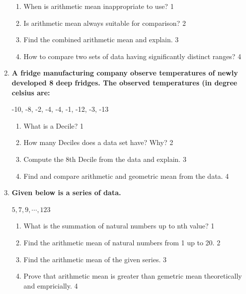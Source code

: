 \documentclass[a4paper,oneside]{book}
\begin{document}
\begin{enumerate}
  \begin{enumerate}
    \item
	When is arithmetic mean inappropriate to use? \hfill 1
    \item
	Is arithmetic mean always suitable for comparison? \hfill 2
    \item  
	Find the combined arithmetic mean and explain. \hfill 3
    \item
	How to compare two sets of data having significantly distinct ranges? \hfill 4
  \end{enumerate}
  
   \item
	  \textbf{A fridge manufacturing company observe temperatures of newly developed 8 deep fridges. The observed temperatures (in degree celsius are:} 
	  
	    \begin{center}
-10, -8, -2, -4, -4, -1, -12, -3, -13
  \end{center}
  
  \begin{enumerate}
    \item
	What is a Decile? \hfill 1
    \item
	How many Deciles does a data set have? Why? \hfill 2
    \item  
	Compute the 8th Decile from the data and explain. \hfill 3
    \item
	Find and compare arithmetic and geometric mean from the data. \hfill 4
  \end{enumerate}
  
   \item
	  \textbf{Given below is a series of data.} 
	  
	  	    \begin{center}
	 $5, 7, 9, \cdots , 123$
	    \end{center}
  
  \begin{enumerate}
    \item
	What is the summation of natural numbers up to nth value? \hfill 1
    \item
	Find the arithmetic mean of natural numbers from 1 up to 20. \hfill 2
    \item  
	Find the arithmetic mean of the given series. \hfill 3
    \item
	Prove that arithmetic mean is greater than gemetric mean theoretically and empricially. \hfill 4
  \end{enumerate}
  

\end{enumerate}
\end{document}
